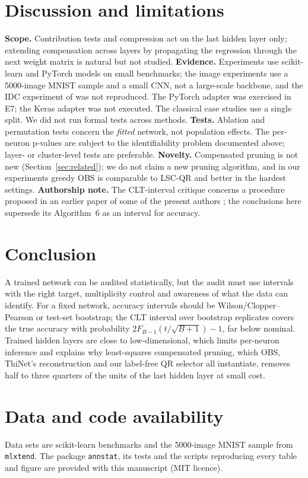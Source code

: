 \documentclass[11pt,a4paper]{article}
\theoremstyle{remark}\newtheorem{remark}{Remark}
\begin{document}
\section{Discussion and limitations}
\textbf{Scope.} Contribution tests and compression act on the last hidden layer only; extending compensation across layers by propagating the regression through the next weight matrix is natural but not studied. \textbf{Evidence.} Experiments use scikit-learn and PyTorch models on small benchmarks; the image experiments use a 5000-image MNIST sample and a small CNN, not a large-scale backbone, and the IDC experiment of \cite{almohamad2024} was not reproduced. The PyTorch adapter was exercised in E7; the Keras adapter was not executed. The classical case studies use a single split. We did not run formal tests across methods. \textbf{Tests.} Ablation and permutation tests concern the \emph{fitted} network, not population effects. The per-neuron p-values are subject to the identifiability problem documented above; layer- or cluster-level tests are preferable. \textbf{Novelty.} Compensated pruning is not new (Section~\ref{sec:related}); we do not claim a new pruning algorithm, and in our experiments greedy OBS is comparable to LSC-QR and better in the hardest settings. \textbf{Authorship note.} The CLT-interval critique concerns a procedure proposed in an earlier paper of some of the present authors \cite{almohamad2024}; the conclusions here supersede its Algorithm~6 as an interval for accuracy.

\section{Conclusion}
A trained network can be audited statistically, but the audit must use intervals with the right target, multiplicity control and awareness of what the data can identify. For a fixed network, accuracy intervals should be Wilson/Clopper--Pearson or test-set bootstrap; the CLT interval over bootstrap replicates covers the true accuracy with probability $2F_{B-1}(t/\sqrt{B+1})-1$, far below nominal. Trained hidden layers are close to low-dimensional, which limits per-neuron inference and explains why least-squares compensated pruning, which OBS, ThiNet's reconstruction and our label-free QR selector all instantiate, removes half to three quarters of the units of the last hidden layer at small cost.

\section*{Data and code availability}
Data sets are scikit-learn benchmarks and the 5000-image MNIST sample from \texttt{mlxtend}. The package \texttt{annstat}, its tests and the scripts reproducing every table and figure are provided with this manuscript (MIT licence).
\end{document}
